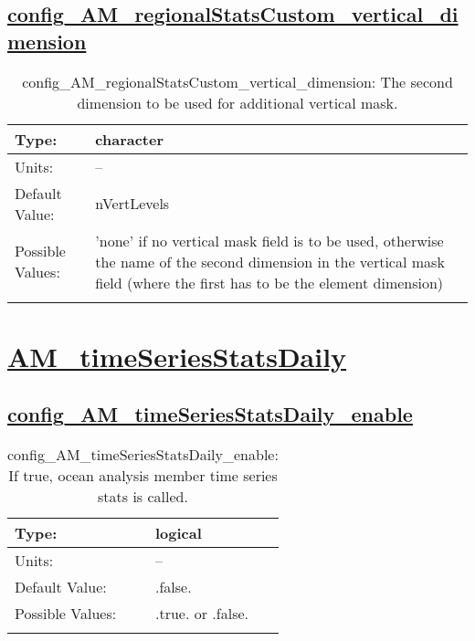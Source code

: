 \subsection[config\_AM\_regionalStatsCustom\_vertical\_dimension]{\hyperref[sec:nm_tab_AM_regionalStatsCustom]{config\_AM\_regionalStatsCustom\_vertical\_dimension}}
\label{subsec:nm_sec_config_AM_regionalStatsCustom_vertical_dimension}
\begin{center}
\begin{longtable}{| p{2.0in} || p{4.0in} |}
    \hline
    Type: & character \\
    \hline
    Units: & -- \\
    \hline
    Default Value: & nVertLevels \\
    \hline
    Possible Values: & 'none' if no vertical mask field is to be used, otherwise the name of the second dimension in the vertical mask field (where the first has to be the element dimension) \\
    \hline
    \caption{config\_AM\_regionalStatsCustom\_vertical\_dimension: The second dimension to be used for additional vertical mask.}
\end{longtable}
\end{center}
\section[AM\_timeSeriesStatsDaily]{\hyperref[sec:nm_tab_AM_timeSeriesStatsDaily]{AM\_timeSeriesStatsDaily}}
\label{sec:nm_sec_AM_timeSeriesStatsDaily}
\subsection[config\_AM\_timeSeriesStatsDaily\_enable]{\hyperref[sec:nm_tab_AM_timeSeriesStatsDaily]{config\_AM\_timeSeriesStatsDaily\_enable}}
\label{subsec:nm_sec_config_AM_timeSeriesStatsDaily_enable}
\begin{center}
\begin{longtable}{| p{2.0in} || p{4.0in} |}
    \hline
    Type: & logical \\
    \hline
    Units: & -- \\
    \hline
    Default Value: & .false. \\
    \hline
    Possible Values: & .true. or .false. \\
    \hline
    \caption{config\_AM\_timeSeriesStatsDaily\_enable: If true, ocean analysis member time series stats is called.}
\end{longtable}
\end{center}
